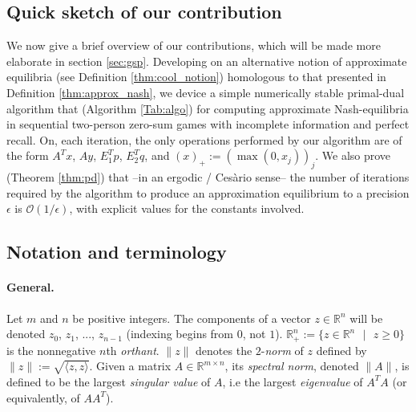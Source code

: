 \documentclass[a4paper,9pt]{extarticle}
\DeclareMathOperator{\proj}{proj}
\begin{document}
\subsection{Quick sketch of our contribution}
\label{sec:sketch}
We now give a brief overview of our contributions, which will be made
more elaborate in section \ref{sec:gsp}.
Developing on an alternative notion of approximate equilibria (see
Definition \ref{thm:cool_notion})
homologous to that presented in Definition \ref{thm:approx_nash}, we
device a simple numerically stable primal-dual algorithm that
(Algorithm \ref{Tab:algo}) for computing approximate Nash-equilibria
in sequential two-person zero-sum games with incomplete information and
perfect recall. On, each iteration, the only operations performed by
our algorithm are of the form $A^Tx$, $Ay$, $E_1^Tp$, $E_2^Tq$, and
$(x)_+ := (\max(0, x_j))_j$. We also prove (Theorem \ref{thm:pd}) that
--in an ergodic / Ces\`ario sense-- the number of iterations required
by the algorithm to produce an approximation equilibrium to a
precision $\epsilon$ is $\mathcal{O}(1/\epsilon)$, with explicit
values for the constants involved.

\subsection{Notation and terminology}
\paragraph*{General.} Let $m$ and $n$ be positive integers.
The components of a vector $z \in \mathbb{R}^n$ will be
denoted $z_0$, $z_1$, ..., $z_{n-1}$ (indexing begins from $0$,
not $1$). $\mathbb{R}^{n}_+ := \{z \in \mathbb{R}^{n}\text{ }|\text{ }
z \geq 0\}$ is the nonnegative $n$th \textit{orthant}.
$\|z\|$ denotes the $2$-\textit{norm} of $z$ defined by $\|z\| :=
\sqrt{\langle z, z\rangle}$. %
Given a matrix $A \in \mathbb{R}^{m \times n}$, its \textit{spectral
  norm}, denoted $\|A\|$, is
 defined to be the largest \textit{singular value} of $A$, i.e the
 largest \textit{eigenvalue} of $A^TA$ (or equivalently, of $AA^T$).
\end{document}
